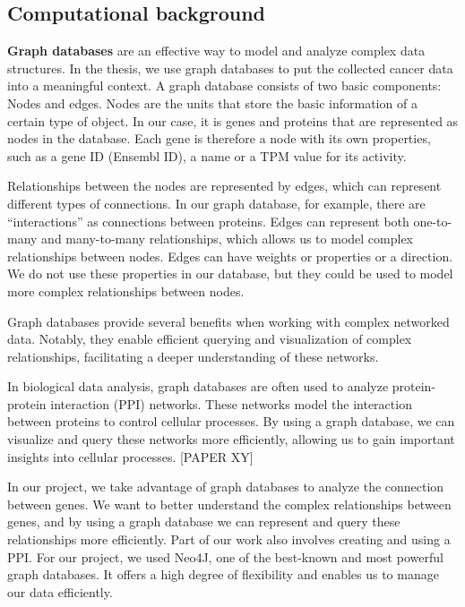 \subsection{Computational background} \label{subsec:computational_background}
\textbf{Graph databases} are an effective way to model and analyze complex data structures.
In the thesis, we use graph databases to put the collected cancer data into a meaningful context.
A graph database consists of two basic components: Nodes and edges.
Nodes are the units that store the basic information of a certain type of object.
In our case, it is genes and proteins that are represented as nodes in the database.
Each gene is therefore a node with its own properties,
such as a gene ID (Ensembl ID), a name or a TPM value for its activity.

Relationships between the nodes are represented by edges, which can represent different types of connections.
In our graph database, for example, there are “interactions” as connections between proteins.
Edges can represent both one-to-many and many-to-many relationships,
which allows us to model complex relationships between nodes.
Edges can have weights or properties or a direction.
We do not use these properties in our database,
but they could be used to model more complex relationships between nodes.

Graph databases provide several benefits when working with complex networked data.
Notably, they enable efficient querying and visualization of complex relationships,
facilitating a deeper understanding of these networks.

In biological data analysis, graph databases are often used to analyze protein-protein interaction (PPI) networks.
These networks model the interaction between proteins to control cellular processes.
By using a graph database, we can visualize and query these networks more efficiently,
allowing us to gain important insights into cellular processes.
[PAPER XY]

In our project, we take advantage of graph databases to analyze the connection between genes.
We want to better understand the complex relationships between genes, and by using a graph database we can represent
and query these relationships more efficiently.
Part of our work also involves creating and using a PPI\@.
For our project, we used Neo4J, one of the best-known and most powerful graph databases.
It offers a high degree of flexibility and enables us to manage our data efficiently.


